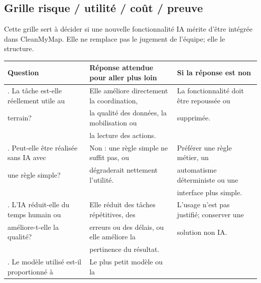 \documentclass[
  10pt,
  a4paper,
  DIV=11,
  numbers=noendperiod,
  oneside]{scrreprt}
\newcounter{none} %
\begin{document}
\subsection{Grille risque / utilité / coût /
preuve}\label{grille-risque-utilituxe9-couxfbt-preuve}

Cette grille sert à décider si une nouvelle fonctionnalité IA mérite
d'être intégrée dans CleanMyMap. Elle ne remplace pas le jugement de
l'équipe; elle le structure.

{\def\LTcaptype{none} %
\begin{longtable}[]{@{}
  >{\raggedright\arraybackslash}p{}
  >{\raggedright\arraybackslash}p{}
  >{\raggedright\arraybackslash}p{}@{}}
\toprule\noalign{}
\begin{minipage}[b]{\linewidth}\raggedright
Question
\end{minipage} & \begin{minipage}[b]{\linewidth}\raggedright
Réponse attendue pour aller plus loin
\end{minipage} & \begin{minipage}[b]{\linewidth}\raggedright
Si la réponse est non
\end{minipage} \\
\midrule\noalign{}
\endhead
\bottomrule\noalign{}
\endlastfoot
1. La tâche est-elle réellement utile au & Elle améliore directement la
coordination, & La fonctionnalité doit être repoussée ou \\
terrain? & la qualité des données, la mobilisation ou & supprimée. \\
& la lecture des actions. & \\
2. Peut-elle être réalisée sans IA avec & Non : une règle simple ne
suffit pas, ou & Préférer une règle métier, un \\
une règle simple? & dégraderait nettement l'utilité. & automatisme
déterministe ou une \\
& & interface plus simple. \\
3. L'IA réduit-elle du temps humain ou & Elle réduit des tâches
répétitives, des & L'usage n'est pas justifié; conserver une \\
améliore-t-elle la qualité? & erreurs ou des délais, ou elle améliore la
& solution non IA. \\
& pertinence du résultat. & \\
4. Le modèle utilisé est-il proportionné à & Le plus petit modèle ou la

\end{longtable}}
\end{document}
